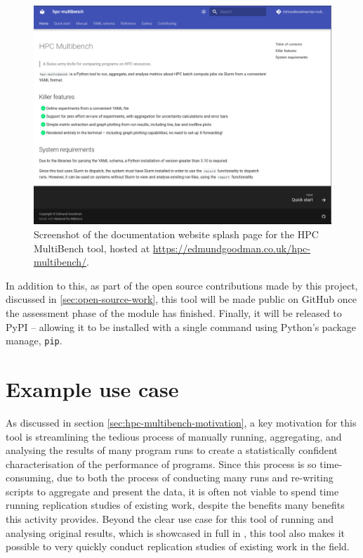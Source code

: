 \begin{figure}[H]
    \centering
    \includegraphics[width=\textwidth]{images/4_tooling/implementation/documentation_splash.png}
    \caption{Screenshot of the documentation website splash page for the HPC MultiBench tool, hosted at \url{https://edmundgoodman.co.uk/hpc-multibench/}.}
    \label{fig:documentation_splash}
\end{figure}

In addition to this, as part of the open source contributions made by this project, discussed in \ref{sec:open-source-work}, this tool will be made public on GitHub once the assessment phase of the module has finished. Finally, it will be released to \acrfull{PyPI} -- allowing it to be installed with a single command using Python's package manage, \texttt{pip}.


\section{Example use case}
\label{sec:hpc-multibench-example-use-case}

As discussed in section \ref{sec:hpc-multibench-motivation}, a key motivation for this tool is streamlining the tedious process of manually running, aggregating, and analysing the results of many program runs to create a statistically confident characterisation of the performance of programs. Since this process is so time-consuming, due to both the process of conducting many runs and re-writing scripts to aggregate and present the data, it is often not viable to spend time running replication studies of existing work, despite the benefits many benefits this activity provides. Beyond the clear use case for this tool of running and analysing original results, which is showcased in full in , this tool also makes it possible to very quickly conduct replication studies of existing work in the field.

